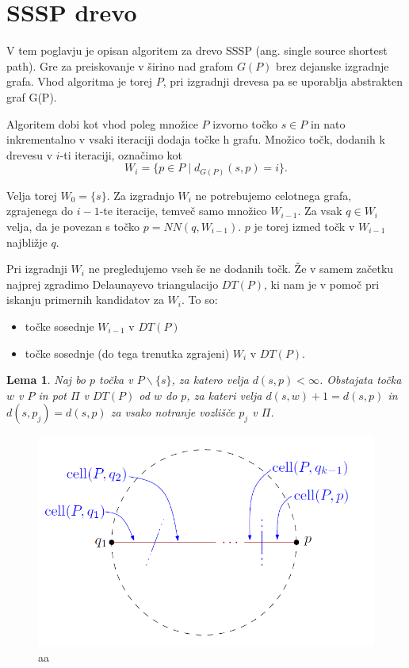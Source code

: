 \documentclass[a4paper, 12pt]{book}
\newtheorem{lema}[izrek]{Lema}
\begin{document}
\section{SSSP drevo}

V tem poglavju je opisan algoritem za drevo SSSP (ang. single source shortest path). Gre za preiskovanje v širino nad grafom $G(P)$ brez dejanske izgradnje grafa. Vhod algoritma je torej $P$, pri izgradnji drevesa pa se uporablja abstrakten graf G(P).

Algoritem dobi kot vhod poleg množice $P$ izvorno točko $s\in P$ in nato inkrementalno v vsaki iteraciji dodaja točke h grafu. Množico točk, dodanih k drevesu v $i$-ti iteraciji, označimo kot
\[	W_i = \{ p\in P \mid d_{G(P)}(s,p) = i\}.
	\]

Velja torej $W_0 = \{s\}$. Za izgradnjo $W_i$ ne potrebujemo celotnega grafa, zgrajenega do $i-1$-te iteracije, temveč samo množico $W_{i-1}$.  Za vsak $q\in W_i$ velja, da je povezan s točko $p = NN(q, W_{i-1})$. $p$ je torej izmed točk v $W_{i-1}$ najbližje $q$.

Pri izgradnji $W_i$ ne pregledujemo vseh še ne dodanih točk. Že v samem začetku najprej zgradimo Delaunayevo triangulacijo $DT(P)$, ki nam je v pomoč pri iskanju primernih kandidatov za $W_i$. To so:

\begin{itemize}
\item točke sosednje $W_{i-1}$ v $DT(P)$
\item točke sosednje (do tega trenutka zgrajeni) $W_i$ v $DT(P)$.
\end{itemize} 

\begin{lema}
\label{lema1}
Naj bo $p$ točka v $P\backslash \{s\}$, za katero velja $d(s,p) < \infty$. Obstajata točka $w$ v $P$ in pot $\Pi$ v $DT(P)$ od $w$ do $p$, za kateri velja $d(s,w)+1 = d(s,p)$ in $d(s,p_j) = d(s,p)$ za vsako notranje vozlišče $p_j$ v $\Pi$.
\end{lema}

\begin{figure}
\centerline{\includegraphics[scale=0.5]{pics/qp_path_proof.png}}
\caption{aa}
\label{c1c2}
\end{figure}
\end{document}
